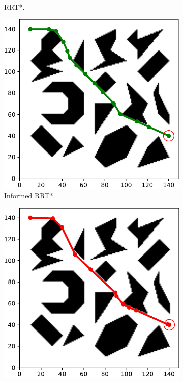 \documentclass{ctuthesis}
\begin{document}
\begin{figure}[!ht]
\begin{subfigure}[b]{0.435\textwidth}
    \caption{RRT*.}
  \end{subfigure}    
  \begin{subfigure}[t]{0.264\textwidth}
    \includegraphics[width=\textwidth]{figChap5/Maze_clutter_final_solution_InformedRRTstar.pdf}  
    \caption{Informed RRT*.}
  \end{subfigure}  
  \begin{subfigure}[t]{0.264\textwidth}
    \includegraphics[width=\textwidth]{figChap5/Maze_clutter_final_solution_RRTsharp.pdf}  

\end{subfigure}
\end{figure}
\end{document}
